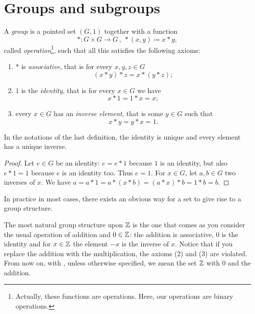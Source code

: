 
\section{Groups and subgroups}

\begin{definition}[Groups]
A {\em group} is a pointed set \((G, 1)\) together with a function
\[\ast : G \times G \to G \,, \ \ast(x, y) \coloneq x \ast y ,\]
called {\em operation}\footnote{Actually, these functions are  operations. Here, our operations are binary operations.}, such that all this satisfies the following axioms:
\begin{enumerate}
\item \(\ast\) is {\em associative}, that is for every \(x,y,z \in G\)
\[(x \ast y) \ast z = x \ast (y \ast z) ;\]
\item \(1\) is the {\em identity}, that is for every \(x \in G\) we have
\[x \ast 1 = 1 \ast x = x ;\]
\item every \(x \in G\) has an {\em inverse element}, that is some \(y \in G\) such that
\[x \ast y = y \ast x = 1 .\]
\end{enumerate}
\end{definition}

\begin{proposition}
In the notations of the last definition, the identity is unique and every element has a unique inverse.
\end{proposition}

\begin{proof}
Let \(e \in G\) be an identity: \(e = e \ast 1\) because \(1\) is an identity, but also \(e \ast 1 = 1\) because \(e\) is an identity too. Thus \(e = 1\). For \(x \in G\), let \(a, b \in G\) two inverses of \(x\). We have \(a = a \ast 1 = a \ast (x \ast b) = (a \ast x) \ast b = 1 \ast b = b\).
\end{proof}


In practice in most cases, there exists an obvious way for a set to give rise to a group structure.

\begin{example}
The most natural group structure upon \(\mathbb Z\) is the one that comes as you consider the usual operation of addition and \(0 \in \mathbb Z\): the addition is associative, \(0\) is the identity and for \(x \in \mathbb Z\) the element \(-x\) is the inverse of \(x\). Notice that if you replace the addition with the multiplication, the axioms (2) and (3) are violated. From now on, with , unless otherwise specified, we mean the set \(\mathbb Z\) with \(0\) and the addition.
\end{example}

